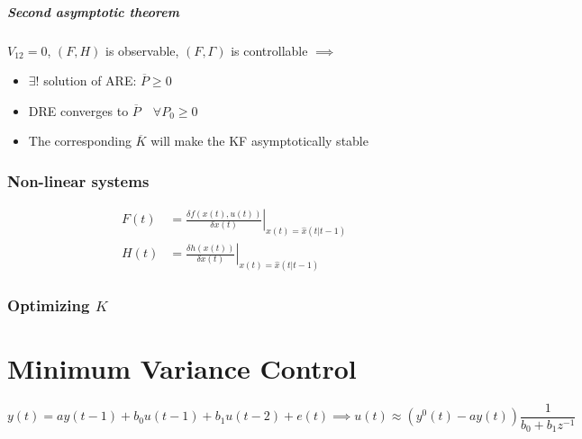 \documentclass{article}
\let\OldPart\part
\renewcommand{\part}{\newpage\OldPart}
\begin{document}
\subsubsection{Second asymptotic theorem}
$V_{12}=0$, $(F,H)$ is observable, $(F,\Gamma)$ is controllable $\implies$
\begin{itemize}
\item $\exists!$ solution of ARE: $\overline{P}\geq 0$
\item DRE converges to $\overline{P}\quad\forall P_0\geq 0$
\item The corresponding $\overline{K}$ will make the KF asymptotically stable
\end{itemize}
\section{Non-linear systems}
\begin{align*}
F(t)&=\left.\frac{\delta f(x(t),u(t))}{\delta x(t)}\right\vert_{x(t)=\hat{x}(t|t-1)}\\
H(t)&=\left.\frac{\delta h(x(t))}{\delta x(t)}\right\vert_{x(t)=\hat{x}(t|t-1)}
\end{align*}
\section{Optimizing $K$}
\part{Minimum Variance Control}
\[
y(t)=ay(t-1)+b_0u(t-1)+b_1u(t-2)+e(t)
\implies
u(t)\approx \left(y^0(t)-ay(t)\right)\frac{1}{b_0+b_1z^{-1}}
\]
\end{document}
